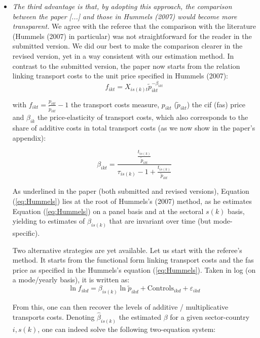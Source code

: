 \documentclass[a4paper,12pt]{article}
\begin{document}
\begin{itemize}
\item \textit{The third advantage is that, by adopting this approach, the comparison between the paper [...] and those in Hummels (2007) would become more transparent.} We agree with the referee that the comparison with the literature (Hummels (2007) in particular) was not straightforward for the reader in the submitted version. We did our best to make the comparison clearer in the revised version, yet in a way consistent with our estimation method. In contrast to the submitted version, the paper now starts from the relation linking transport costs to the unit price specified in Hummels (2007):
    \begin{equation}
    f_{ikt} = X_{is(k)t}\widetilde{p}_{ikt}^{-\beta_{ikt}} \label{eq:Hummels}
    \end{equation}

     with $f_{ikt} = \frac{p_{ikt}}{\widetilde{p}_{ikt}} -1 $ the transport costs measure, $p_{ikt}$ ($\widetilde{p}_{ikt}$) the cif (fas) price and $\beta_{ik}$ the price-elasticity of transport costs, which also corresponds to the share of additive costs in total transport costs (as we now show in the paper's appendix):

     \begin{equation}
     \beta_{ikt} = \frac{\frac{t_{is(k)}}{\widetilde{p}_{ikt}}}{\tau_{is(k)}-1+\frac{t_{is(k)}}{\widetilde{p}_{ikt}} } \label{eq:beta_TC}
     \end{equation}

     As underlined in the paper (both submitted and revised versions), Equation (\ref{eq:Hummels}) lies at the root of Hummels's (2007) method, as he estimates Equation (\ref{eq:Hummels}) on a panel basis and at the sectoral $s(k)$ basis, yielding to estimates of $\beta_{is(k)}$ that are invariant over time (but mode-specific).

     Two alternative strategies are yet available. Let us start with the referee's method. It starts from the functional form linking transport costs and the fas price as specified in the Hummels's equation (\ref{eq:Hummels}). Taken in log (on a mode/yearly basis), it is written as:
     $$\ln f_{ikd} = \beta_{is(k)}\ln \widetilde{p}_{ikd} +\text{Controls}_{ikd}+ \varepsilon_{ikd}$$

     From this, one can then recover the levels of additive / multiplicative transports costs. Denoting $\widehat{\beta}_{is(k)}$ the estimated $\beta$ for a given sector-country $i,s(k)$, one can indeed solve the following two-equation system:


\end{itemize}
\end{document}
